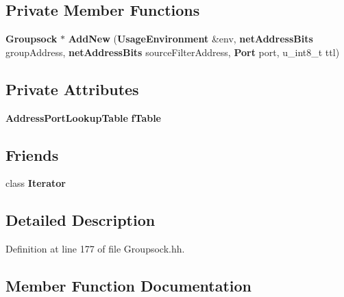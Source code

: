 \subsection*{Private Member Functions}
\begin{DoxyCompactItemize}
\item 
{\bf Groupsock} $\ast$ {\bf Add\+New} ({\bf Usage\+Environment} \&env, {\bf net\+Address\+Bits} group\+Address, {\bf net\+Address\+Bits} source\+Filter\+Address, {\bf Port} port, u\+\_\+int8\+\_\+t ttl)
\end{DoxyCompactItemize}
\subsection*{Private Attributes}
\begin{DoxyCompactItemize}
\item 
{\bf Address\+Port\+Lookup\+Table} {\bf f\+Table}
\end{DoxyCompactItemize}
\subsection*{Friends}
\begin{DoxyCompactItemize}
\item 
class {\bf Iterator}
\end{DoxyCompactItemize}


\subsection{Detailed Description}


Definition at line 177 of file Groupsock.\+hh.



\subsection{Member Function Documentation}
